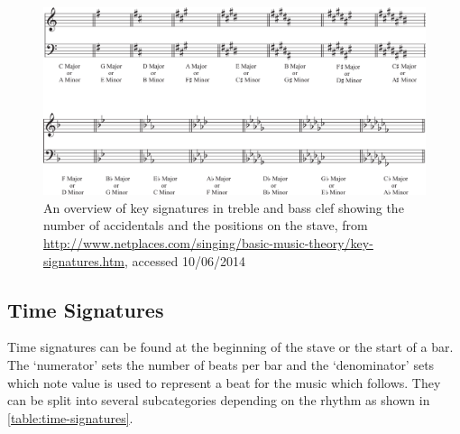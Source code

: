 \begin{figure}[H]
    \includegraphics[width=\linewidth]{gfx/music-theory/key-signatures.jpg}
    \caption{An overview of key signatures in treble and bass clef showing the number of accidentals and the positions on the stave, from \url{http://www.netplaces.com/singing/basic-music-theory/key-signatures.htm}, accessed 10/06/2014}
    \label{table:key-signatures}
\end{figure}



\subsection{Time Signatures}
\label{sec:music-theory-time-signatures}

Time signatures can be found at the beginning of the stave or the start of a bar. The `numerator' sets the number of beats per bar and the `denominator' sets which note value is used to represent a beat for the music which follows. They can be split into several subcategories depending on the rhythm as shown in \cref{table:time-signatures}.

